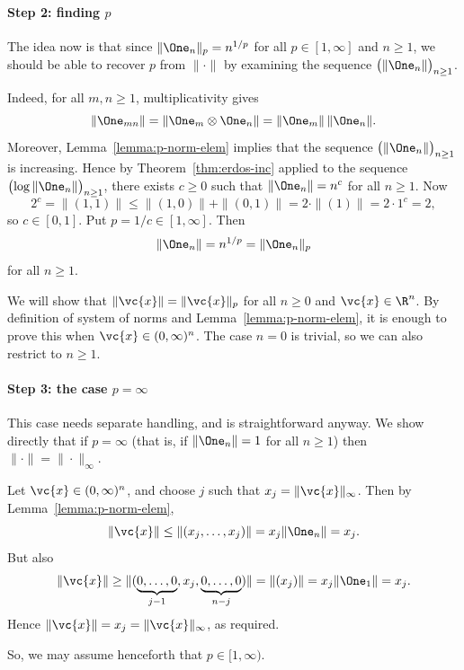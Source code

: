 \paragraph*{Step 2: finding $p$}
The idea now is that since $\|\One_n\|_p = n^{1/p}$ for all $p \in [1,
  \infty]$ and $n \geq 1$, we should be able to recover $p$ from
$\|\cdot\|$ by examining the sequence $\bigl(\|\One_n\|\bigr)_{n \geq 1}$.

Indeed, for all $m, n \geq 1$, multiplicativity gives
\[
\|\One_{mn}\| 
= 
\|\One_m \otimes \One_n\| 
=
\|\One_m\| \, \|\One_n\|.
\]
Moreover, Lemma~\ref{lemma:p-norm-elem} implies that
the sequence $\bigl( \|\One_n\| \bigr)_{n \geq 1}$ is increasing.  Hence by
Theorem~\ref{thm:erdos-inc} applied to the sequence $\bigl( \log \|\One_n\|
\bigr)_{n \geq 1}$, there exists $c \geq 0$ such that $\|\One_n\| = n^c$
for all $n \geq 1$.  Now
\[
2^c
=
\|(1, 1)\|      
\leq
\|(1, 0)\| + \|(0, 1)\| 
=
2 \cdot \|(1)\| 
=
2 \cdot 1^c
=
2,
\]
so $c \in [0, 1]$.  Put $p = 1/c \in [1, \infty]$.  Then
\[
\|\One_n\| = n^{1/p} = \|\One_n\|_p
\]
for all $n \geq 1$.

We will show that $\|\vc{x}\| = \|\vc{x}\|_p$ for all $n \geq 0$ and
$\vc{x} \in \R^n$.  By definition of system of norms and
Lemma~\ref{lemma:p-norm-elem}, it is enough to prove
this when $\vc{x} \in (0, \infty)^n$.  The case $n = 0$ is trivial, so we
can also restrict to $n \geq 1$.

\paragraph*{Step 3: the case $p = \infty$}
This case needs separate handling, and is straightforward anyway.  We show
directly that if $p = \infty$ (that is, if $\|\One_n\| = 1$ for all $n \geq
1$) then $\|\cdot\| = \|\cdot\|_\infty$.

Let $\vc{x} \in (0, \infty)^n$, and choose $j$ such that $x_j =
\|\vc{x}\|_\infty$.  Then by
Lemma~\ref{lemma:p-norm-elem}, 
\[
\|\vc{x}\|
\leq
\|(x_j, \ldots, x_j)\|
=
x_j \|\One_n\|
=
x_j.
\]
But also 
\[
\|\vc{x}\|
\geq
\|(\underbrace{0, \ldots, 0}_{j - 1}, x_j, 
\underbrace{0, \ldots, 0}_{n - j})\|
=
\|(x_j)\|
=
x_j \|\One_1\|
=
x_j.
\]
Hence $\|\vc{x}\| = x_j = \|\vc{x}\|_\infty$, as required.

So, we may assume henceforth that $p \in [1, \infty)$.

